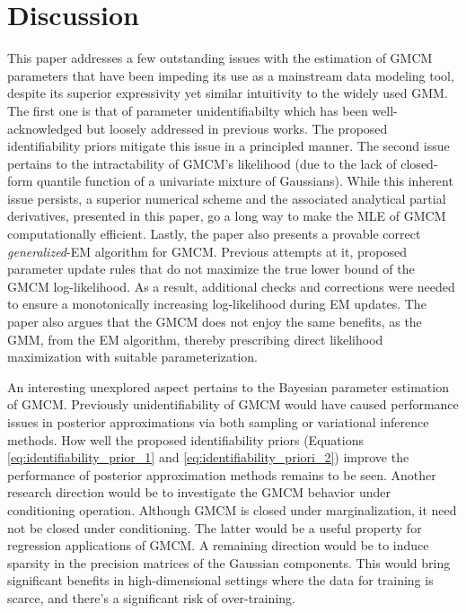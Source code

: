 \documentclass{article}
\theoremstyle{plain}
\theoremstyle{definition}
\theoremstyle{remark}
\begin{document}
\section{Discussion}\label{sec:Discussion}
This paper addresses a few outstanding issues with the estimation of GMCM parameters that have been impeding its use as a mainstream data modeling tool, despite its superior expressivity yet similar intuitivity to the widely used GMM. The first one is that of parameter unidentifiabilty which has been well-acknowledged but loosely addressed in previous works. The proposed identifiability priors mitigate this issue in a principled manner. The second issue pertains to the intractability of GMCM's likelihood (due to the lack of closed-form quantile function of a univariate mixture of Gaussians). While this inherent issue persists, a superior numerical scheme and the associated analytical partial derivatives, presented in this paper, go a long way to make the MLE of GMCM computationally efficient. Lastly, the paper also presents a provable correct \emph{generalized}-EM algorithm for GMCM. Previous attempts at it, proposed parameter update rules that do not maximize the true lower bound of the GMCM log-likelihood. As a result, additional checks and corrections were needed to ensure a monotonically increasing log-likelihood during EM updates. The paper also argues that the GMCM does not enjoy the same benefits, as the GMM, from the EM algorithm, thereby prescribing direct likelihood maximization with suitable parameterization.   

An interesting unexplored aspect pertains to the Bayesian parameter estimation of GMCM. Previously unidentifiability of GMCM would have caused performance issues in posterior approximations via both sampling or variational inference methods. How well the proposed identifiability priors (Equations \eqref{eq:identifiability_prior_1} and \eqref{eq:identifiability_priori_2}) improve the performance of posterior approximation methods remains to be seen. Another research direction would be to investigate the GMCM behavior under conditioning operation. Although GMCM is closed under marginalization, it need not be closed under conditioning. The latter would be a useful property for regression applications of GMCM.  A remaining direction would be to induce sparsity in the precision matrices of the Gaussian components. This would bring significant benefits in high-dimensional settings where the data for training is scarce, and there's a significant risk of over-training. 
\end{document}
